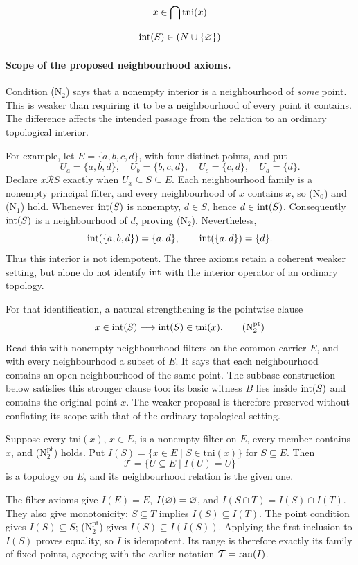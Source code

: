 \begin{axiom*}[N$_1$]
\[
x\in\bigcap \mathrm{tni}(x)
\]
\end{axiom*}

\begin{axiom*}[N$_2$]
\[
\mathrm{int}(S)\in \left(N\cup\{\varnothing\}\right)
\]
\end{axiom*}
\paragraph{Scope of the proposed neighbourhood axioms.}
Condition (N$_2$) says that a nonempty interior is a neighbourhood of
\emph{some} point. This is weaker than requiring it to be a neighbourhood
of every point it contains. The difference affects the intended passage
from the relation to an ordinary topological interior.

For example, let $E=\{a,b,c,d\}$, with four distinct points, and put
\[
U_a=\{a,b,d\},\quad U_b=\{b,c,d\},\quad
U_c=\{c,d\},\quad U_d=\{d\}.
\]
Declare $x\mathcal{R}S$ exactly when $U_x\subseteq S\subseteq E$.
Each neighbourhood family is a nonempty principal filter, and every
neighbourhood of $x$ contains $x$, so (N$_0$) and (N$_1$) hold.
Whenever $\mathrm{int}(S)$ is nonempty, $d\in S$, hence
$d\in\mathrm{int}(S)$. Consequently $\mathrm{int}(S)$ is a neighbourhood
of $d$, proving (N$_2$). Nevertheless,
\[
\mathrm{int}(\{a,b,d\})=\{a,d\},\qquad
\mathrm{int}(\{a,d\})=\{d\}.
\]
Thus this interior is not idempotent. The three axioms retain a coherent
weaker setting, but alone do not identify $\mathrm{int}$ with the interior
operator of an ordinary topology.

For that identification, a natural strengthening is the pointwise clause
\[
x\in\interior(S)\implies
\interior(S)\in\mathrm{tni}(x).
\tag{N$_2^{\mathrm{pt}}$}
\]
Read this with nonempty neighbourhood filters on the common carrier $E$,
and with every neighbourhood a subset of $E$. It says that each
neighbourhood contains an open neighbourhood of the same point.
The subbase construction below satisfies this stronger clause too: its
basic witness $B$ lies inside $\mathrm{int}(S)$ and contains the original
point $x$. The weaker proposal is therefore preserved without conflating
its scope with that of the ordinary topological setting.

\begin{theorem}
Suppose every $\mathrm{tni}(x)$, $x\in E$, is a nonempty filter on
$E$, every member contains $x$, and (N$_2^{\mathrm{pt}}$) holds.
Put $I(S)=\{x\in E\mid S\in\mathrm{tni}(x)\}$ for $S\subseteq E$.
Then
\[
\mathcal{T}=\{U\subseteq E\mid I(U)=U\}
\]
is a topology on $E$, and its neighbourhood relation is the given one.
\end{theorem}
\Proof
The filter axioms give $I(E)=E$, $I(\varnothing)=\varnothing$, and
$I(S\cap T)=I(S)\cap I(T)$. They also give monotonicity:
$S\subseteq T$ implies $I(S)\subseteq I(T)$. The point condition
gives $I(S)\subseteq S$; (N$_2^{\mathrm{pt}}$) gives
$I(S)\subseteq I(I(S))$. Applying the first inclusion to $I(S)$
proves equality, so $I$ is idempotent. Its range is therefore exactly
its family of fixed points, agreeing with the earlier notation
$\mathcal{T}=\mathrm{ran}(I)$.

